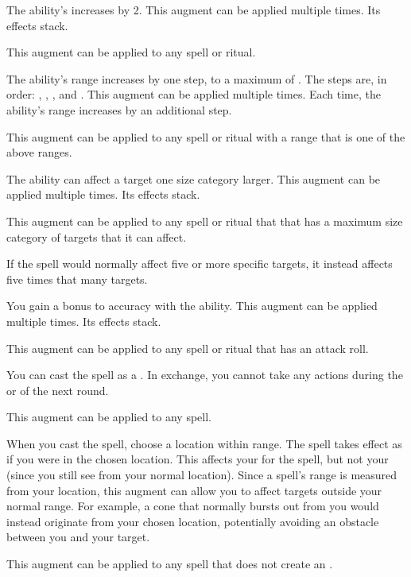              The ability's  increases by 2.
            This augment can be applied multiple times.
            Its effects stack.
            \par This augment can be applied to any spell or ritual.

             The ability's range increases by one step, to a maximum of \rngext.
            The steps are, in order: \rngclose, \rngmed, \rnglong, and \rngext.
            This augment can be applied multiple times.
            Each time, the ability's range increases by an additional step.
            \par This augment can be applied to any spell or ritual with a range that is one of the above ranges.

             The ability can affect a target one size category larger.
            This augment can be applied multiple times.
            Its effects stack.
            \par This augment can be applied to any spell or ritual that that has a maximum size category of targets that it can affect.

             If the spell would normally affect five or more specific targets, it instead affects five times that many targets.

             You gain a  bonus to accuracy with the ability.
            This augment can be applied multiple times.
            Its effects stack.
            \par This augment can be applied to any spell or ritual that has an attack roll.

             You can cast the spell as a .
            In exchange, you cannot take any actions during the  or  of the next round.
            \par This augment can be applied to any spell.

             When you cast the spell, choose a location within \rngclose range.
            The spell takes effect as if you were in the chosen location.
            This affects your  for the spell, but not your  (since you still see from your normal location).
            Since a spell's range is measured from your location, this augment can allow you to affect targets outside your normal range.
            For example, a cone that normally bursts out from you would instead originate from your chosen location, potentially avoiding an obstacle between you and your target.
            \par This augment can be applied to any spell that does not create an .

